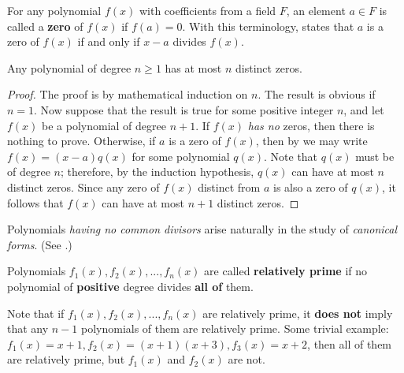 \begin{remark} \label{remark e.2}
For any polynomial \(f(x)\) with coefficients from a field \(F\), an element \(a \in F\) is called a \textbf{zero} of \(f(x)\) if \(f(a) = 0\).
With this terminology,  states that \(a\) is a zero of \(f(x)\) if and only if \(x - a\) divides \(f(x)\).
\end{remark}

\begin{appendix corollary} \label{corollary e.1.2}
Any polynomial of degree \(n \ge 1\) has at most \(n\) distinct zeros.
\end{appendix corollary}

\begin{proof}
The proof is by mathematical induction on \(n\).
The result is obvious if \(n = 1\).
Now suppose that the result is true for some positive integer \(n\), and let \(f(x)\) be a polynomial of degree \(n + 1\).
If \(f(x)\) \emph{has no} zeros, then there is nothing to prove.
Otherwise, if \(a\) is a zero of \(f(x)\), then by  we may write \(f(x) = (x - a)q(x)\) for some polynomial \(q(x)\).
Note that \(q(x)\) must be of degree \(n\);
therefore, by the induction hypothesis, \(q(x)\) can have at most \(n\) distinct zeros.
Since any zero of \(f(x)\) distinct from \(a\) is also a zero of \(q(x)\), it follows that \(f(x)\) can have at most \(n + 1\) distinct zeros.
\end{proof}

\begin{remark} \label{remark e.3}
Polynomials \emph{having no common divisors} arise naturally in the study of \emph{canonical forms}.
(See .)
\end{remark}

\begin{appendix definition} \label{def e.2}
Polynomials \(f_1(x), f_2(x), ..., f_n(x)\) are called \textbf{relatively prime} if no polynomial of \textbf{positive} degree divides \textbf{all of} them.
\end{appendix definition}

\begin{remark} \label{remark e.4}
Note that if \(f_1(x), f_2(x), ..., f_n(x)\) are relatively prime, it \textbf{does not} imply that any \(n - 1\) polynomials of them are relatively prime.
Some trivial example: \(f_1(x) = x + 1, f_2(x) = (x + 1)(x + 3), f_3(x) = x + 2\), then all of them are relatively prime, but \(f_1(x)\) and \(f_2(x)\) are not.
\end{remark}

